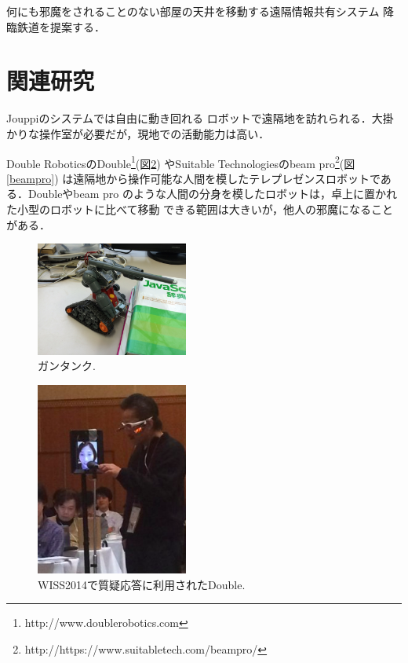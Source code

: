 \documentclass[submit,techreq]{ipsj}
\begin{document}
何にも邪魔をされることのない部屋の天井を移動する遠隔情報共有システム
降臨鉄道を提案する．

\section{関連研究}

Jouppiのシステム\cite{Jouppi:2002:FST:587078.587128}では自由に動き回れる
ロボットで遠隔地を訪れられる．大掛かりな操作室が必要だが，現地での活動能力は高い．

Double RoboticsのDouble\footnote{
  \textsf{http://www.doublerobotics.com}
}(図\ref{double})
やSuitable Technologiesのbeam pro\footnote{
  \textsf{http://https://www.suitabletech.com/beampro/}
}(図\ref{beampro})
は遠隔地から操作可能な人間を模したテレプレゼンスロボットである．Doubleやbeam pro
のような人間の分身を模したロボットは，卓上に置かれた小型のロボットに比べて移動
できる範囲は大きいが，他人の邪魔になることがある．

\begin{figure}[H]
\centerline{\includegraphics[width=50mm]{figures/1e8781bb2a5b28c8e06906d226c7505a.png}}
\caption{ガンタンク.}
\label{Guntank}
\end{figure}


\begin{figure}[H]
\centerline{\includegraphics[width=50mm]{figures/b74f4564d4b38d12e48fcf80fef96def.png}}
\caption{WISS2014で質疑応答に利用されたDouble.}
\label{double}
\end{figure}
\end{document}
